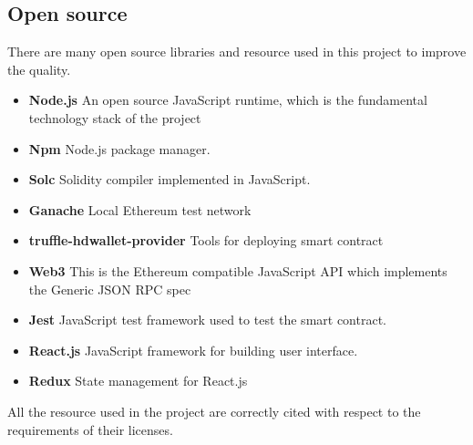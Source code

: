 \documentclass[openany,12pt]{ecsthesis}      %
\begin{document}
\subsection{Open source}
There are many open source libraries and resource used in this project to improve the quality.
\begin{itemize}
  \item \textbf{Node.js} \cite{nodejs} An open source JavaScript runtime, which is the fundamental technology stack of the project
  \item \textbf{Npm} \cite{npm} Node.js package manager.
  \item \textbf{Solc} \cite{solc} Solidity compiler implemented in JavaScript.
  \item \textbf{Ganache} \cite{ganache} Local Ethereum test network
  \item \textbf{truffle-hdwallet-provider} \cite{ganache} Tools for deploying smart contract
  \item \textbf{Web3} \cite{web3} This is the Ethereum compatible JavaScript API which implements the Generic JSON RPC spec
  \item \textbf{Jest} \cite{jest} JavaScript test framework used to test the smart contract.
  \item \textbf{React.js} \cite{react} JavaScript framework for building user interface.
  \item \textbf{Redux} \cite{redux} State management for React.js
\end{itemize}
All the resource used in the project are correctly cited with respect to the requirements of their licenses.
\end{document}
